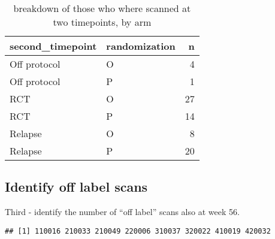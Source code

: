 \documentclass[]{article}
\newenvironment{Shaded}{\begin{snugshade}}{\end{snugshade}}
\newcommand{\KeywordTok}[1]{\textcolor[rgb]{0.13,0.29,0.53}{\textbf{#1}}}
\newcommand{\StringTok}[1]{\textcolor[rgb]{0.31,0.60,0.02}{#1}}
\newcommand{\CommentTok}[1]{\textcolor[rgb]{0.56,0.35,0.01}{\textit{#1}}}
\newcommand{\OperatorTok}[1]{\textcolor[rgb]{0.81,0.36,0.00}{\textbf{#1}}}
\newcommand{\NormalTok}[1]{#1}
\theoremstyle{definition}
\theoremstyle{definition}
\theoremstyle{definition}
\theoremstyle{remark}
\begin{document}
\begin{table}

\caption{\label{tab:SecondScan-subcounts}breakdown of those who where scanned at two timepoints, by arm}
\centering
\begin{tabular}[t]{l|l|r}
\hline
second\_timepoint & randomization & n\\
\hline
Off protocol & O & 4\\
\hline
Off protocol & P & 1\\
\hline
RCT & O & 27\\
\hline
RCT & P & 14\\
\hline
Relapse & O & 8\\
\hline
Relapse & P & 20\\
\hline
\end{tabular}
\end{table}

\subsection{Identify off label scans}\label{identify-off-label-scans}

Third - identify the number of ``off label'' scans also at week 56.

\begin{Shaded}
\end{Shaded}

\begin{verbatim}
## [1] 110016 210033 210049 220006 310037 320022 410019 420032
\end{verbatim}
\end{document}
